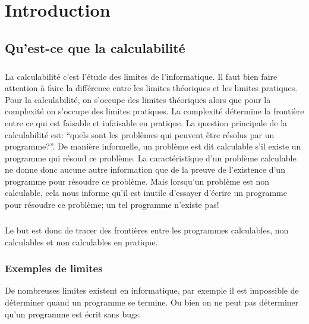 
\chapter{Introduction}
\label{ch:introduction}

\section{Qu'est-ce que la calculabilité}
\label{sec:qu_est-ce_la_calculabilite}

\paragraph{}

La calculabilité c'est l'étude des limites de l'informatique. Il faut bien
faire attention à faire la différence entre les limites théoriques et les limites
pratiques. Pour la calculabilité, on s'occupe des limites théoriques alors que pour 
la complexité on s'occupe des limites pratiques. La complexité
détermine la frontière entre ce qui est faisable et infaisable en pratique.
La question principale de la calculabilité est: ``quels sont les problèmes qui peuvent
être résolus par un programme?''.  De manière informelle, un problème est dit calculable s'il existe un programme qui résoud ce problème.  La caractéristique d'un problème calculable ne donne donc aucune 
autre information que de la preuve de l'existence d'un programme pour résoudre ce problème.  Mais lorsqu'un problème est non calculable, cela nous informe qu'il est inutile d'essayer d'écrire un programme pour résoudre ce problème; un tel programme n'existe pas!

\paragraph{} Le but est donc de tracer des frontières entre les programmes calculables,
non calculables et non calculables en pratique.


\subsection{Exemples de limites}
\label{subsec:exemples_limites}

De nombreuses limites existent en informatique, par exemple il est impossible de déterminer quand un programme se termine. Ou bien on ne peut pas déterminer qu'un programme est écrit sans bugs.

